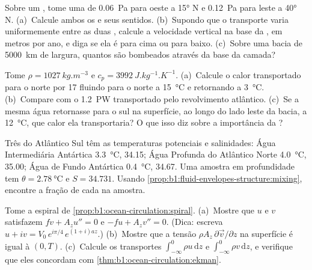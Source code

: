 \begin{exercise}[$\star\star$]\label{exo:b1:ocean-circulation:7}
Sobre um , tome uma  de \qty{0.06}{Pa} para oeste a
\ang{15} N e \qty{0.12}{Pa} para leste a \ang{40} N. (a)~Calcule ambos os  e seus sentidos. (b)~Supondo que o transporte varia uniformemente entre as
duas , calcule a velocidade vertical na base da , em
metros por ano, e diga se ela é para cima ou para baixo. (c)~Sobre uma bacia de
\qty{5000}{km} de largura, quantos  são bombeados através da base da camada?
\end{exercise}

\begin{exercise}[$\star\star$]\label{exo:b1:ocean-circulation:8}
Tome $\rho = \qty{1027}{kg.m^{-3}}$ e $c_p = \qty{3992}{J.kg^{-1}.K^{-1}}$.
(a)~Calcule o calor transportado para o norte por \qty{17}{\sverdrup} fluindo para o norte a
\qty{15}{\celsius} e retornando a \qty{3}{\celsius}. (b)~Compare com o
\qty{1.2}{PW} transportado pelo revolvimento atlântico. (c)~Se a mesma água retornasse
para o sul na superfície, ao longo do lado leste da bacia, a \qty{12}{\celsius},
que calor ela transportaria? O que isso diz sobre a importância da
?
\end{exercise}

\begin{exercise}[$\star\star$]\label{exo:b1:ocean-circulation:9}
Três  do Atlântico Sul têm as temperaturas potenciais e
salinidades: Água Intermediária Antártica \qty{3.3}{\celsius}, 34.15; Água Profunda do
Atlântico Norte \qty{4.0}{\celsius}, 35.00; Água de Fundo Antártica \qty{0.4}{\celsius},
34.67. Uma amostra em profundidade tem $\theta = \qty{2.78}{\celsius}$ e $S = 34.731$.
Usando \cref{prop:b1:fluid-envelopes-structure:mixing}, encontre a fração de cada
 na amostra.
\end{exercise}

\begin{exercise}[$\star\star\star$]\label{exo:b1:ocean-circulation:10}
Tome a espiral de \cref{prop:b1:ocean-circulation:spiral}. (a)~Mostre que $u$ e $v$
satisfazem $f v + A_z u'' = 0$ e $-f u + A_z v'' = 0$. (Dica: escreva $u + iv =
V_0\,e^{i\pi/4}\,e^{(1+i)az}$.) (b)~Mostre que a tensão $\rho A_z\,\partial\vec
v/\partial z$ na superfície é igual à  $(0, T)$. (c)~Calcule os
transportes $\int_{-\infty}^0 \rho u\,\mathrm dz$ e $\int_{-\infty}^0 \rho
v\,\mathrm dz$, e verifique que eles concordam com
\cref{thm:b1:ocean-circulation:ekman}.
\end{exercise}

